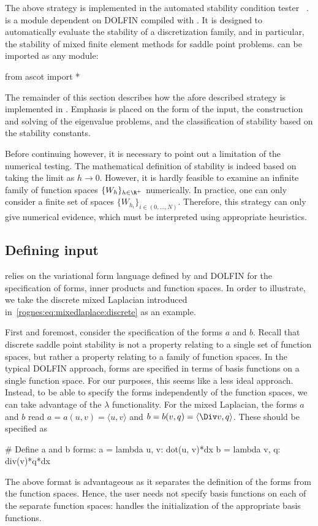 The above strategy is implemented in the automated stability condition
tester \rognesascot{}~\citep{Rognes2009}. \rognesascot{} is a
\rognespython{} module dependent on DOLFIN compiled with
\slepc{}. It is designed to automatically evaluate the stability of a
discretization family, and in particular, the stability of mixed
finite element methods for saddle point problems. \rognesascot{} can
be imported as any \rognespython{} module:
\begin{python}
from ascot import *
\end{python}
The remainder of this section describes how the afore described
strategy is implemented in \rognesascot{}. Emphasis is placed on the
form of the input, the construction and solving of the eigenvalue
problems, and the classification of stability based on the stability
constants.

Before continuing however, it is necessary to point out a limitation
of the numerical testing. The mathematical definition of stability is
indeed based on taking the limit as $h \rightarrow 0$. However, it is
hardly feasible to examine an infinite family of function spaces
$\{W_h\}_{h \in \R^{+}}$ numerically. In practice, one can only
consider a finite set of spaces $\{W_{h_i}\}_{i \in (0, \dots,
N)}$. Therefore, this strategy can only give numerical evidence, which
must be interpreted using appropriate heuristics.

\subsection{Defining input}
\label{rognes:subsec:input}

\rognesascot{} relies on the variational form language defined by \ufl{} and
DOLFIN for the specification of forms, inner products and function
spaces.  In order to illustrate, we take the discrete mixed Laplacian
introduced in~\eqref{rognes:eq:mixedlaplace:discrete} as an example.

First and foremost, consider the specification of the forms $a$ and
$b$. Recall that discrete saddle point stability is not a property
relating to a single set of function spaces, but rather a property
relating to a family of function spaces. In the typical DOLFIN
approach, forms are specified in terms of basis functions on a single
function space. For our purposes, this seems like a less ideal
approach. Instead, to be able to specify the forms independently of
the function spaces, we can take advantage of the \rognespython{}
$\lambda$ functionality. For the mixed Laplacian, the forms $a$ and
$b$ read $a = a(u, v) = \langle u, v \rangle$ and $b = b(v, q) =
\langle \Div v, q \rangle$. These should be specified as
\begin{python}
# Define a and b forms:
a = lambda u, v: dot(u, v)*dx
b = lambda v, q: div(v)*q*dx
\end{python}
The above format is advantageous as it separates the definition of the
forms from the function spaces. Hence, the user needs not specify
basis functions on each of the separate function
spaces: \rognesascot{} handles the initialization of the appropriate
basis functions.

